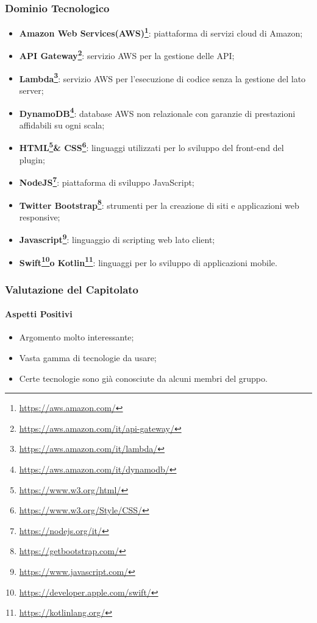 \subsubsection{Dominio Tecnologico}
\begin{itemize}
	\item \textbf{Amazon Web Services(AWS)\footnote{\url{https://aws.amazon.com/}}\glossario}: piattaforma di servizi cloud di Amazon;
	\item \textbf{API Gateway\footnote{\url{https://aws.amazon.com/it/api-gateway/}}\glossario}: servizio AWS per la gestione delle API;
	\item \textbf{Lambda\footnote{\url{https://aws.amazon.com/it/lambda/}}\glossario}: servizio AWS per l’esecuzione di codice senza la gestione del lato server;
	\item \textbf{DynamoDB\footnote{\url{https://aws.amazon.com/it/dynamodb/}}\glossario}: database AWS non relazionale con garanzie di prestazioni affidabili su ogni scala;
	\item \textbf{HTML\footnote{\url{https://www.w3.org/html/}}\glossario \& CSS\footnote{\url{https://www.w3.org/Style/CSS/}}\glossario}: linguaggi utilizzati per lo sviluppo del front-end del plugin;
	\item \textbf{NodeJS\footnote{\url{https://nodejs.org/it/}}\glossario}: piattaforma di sviluppo JavaScript;
	\item \textbf{Twitter Bootstrap\footnote{\url{https://getbootstrap.com/}}\glossario}: strumenti per la creazione di siti e applicazioni web responsive;
	\item \textbf{Javascript\footnote{\url{https://www.javascript.com/}}}: linguaggio di scripting web lato client;
	\item \textbf{Swift\footnote{\url{https://developer.apple.com/swift/}}\glossario o Kotlin\footnote{\url{https://kotlinlang.org/}}\glossario}: linguaggi per lo sviluppo di applicazioni mobile.
\end{itemize}

\subsubsection{Valutazione del Capitolato}
\paragraph{Aspetti Positivi}
\begin{itemize}
	\item Argomento molto interessante;
	\item Vasta gamma di tecnologie da usare;
	\item Certe tecnologie sono già conosciute da alcuni membri del gruppo.
\end{itemize}

